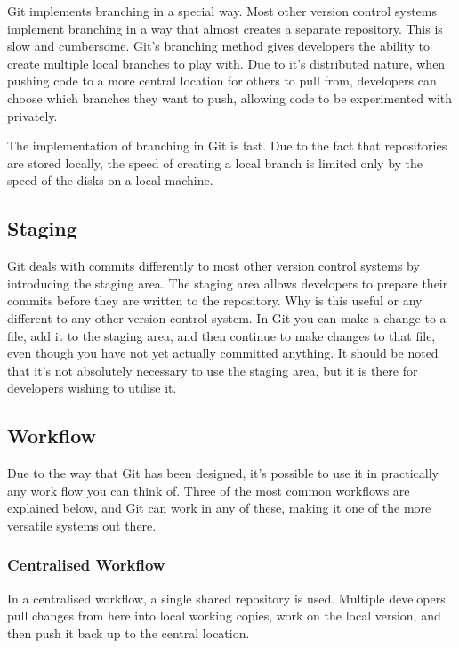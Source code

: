 Git implements branching in a special way.  Most other version control systems implement branching in a way that almost creates a separate repository.  This is slow and cumbersome.  Git's branching method gives developers the ability to create multiple local branches to play with.  Due to it's distributed nature, when pushing code to a more central location for others to pull from, developers can choose which branches they want to push, allowing code to be experimented with privately.

The implementation of branching in Git is fast.  Due to the fact that repositories are stored locally, the speed of creating a local branch is limited only by the speed of the disks on a local machine.

\subsection{Staging}

Git deals with commits differently to most other version control systems by introducing the staging area.  The staging area allows developers to prepare their commits before they are written to the repository.  Why is this useful or any different to any other version control system.  In Git you can make a change to a file, add it to the staging area, and then continue to make changes to that file, even though you have not yet actually committed anything.
It should be noted that it's not absolutely necessary to use the staging area, but it is there for developers wishing to utilise it.

\subsection{Workflow}

Due to the way that Git has been designed, it's possible to use it in practically any work flow you can think of.  Three of the most common workflows are explained below, and Git can work in any of these, making it one of the more versatile systems out there.

\subsubsection{Centralised Workflow}

In a centralised workflow, a single shared repository is used.  Multiple developers pull changes from here into local working copies, work on the local version, and then push it back up to the central location.  

